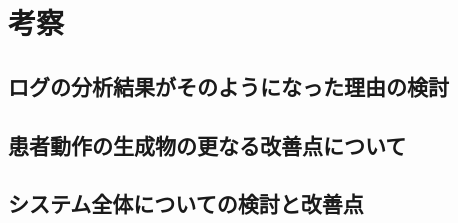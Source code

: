 \section{考察}\label{consideration}

\subsection{ログの分析結果がそのようになった理由の検討}\label{consideration_checklog}

\subsection{患者動作の生成物の更なる改善点について}\label{consideration_generate}

\subsection{システム全体についての検討と改善点}\label{consideration_system}
